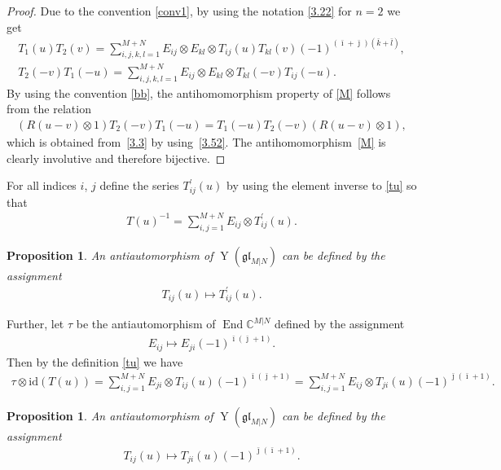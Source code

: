 \documentclass[10pt,a4paper]{amsart}
\numberwithin{equation}{section}
\newtheorem{Proposition}[Theorem]{Proposition}
\def\bi{{\bar\imath }}
\def\bj{{\bar\jmath }}
\def\bk{{\bar k }}
\def\bl{{\bar l }}
\def\CC{{\mathbb{C}}}
\def\CMN{\CC^{M|N}}
\def\End{\operatorname{End}}
\def\glMN{\mathfrak{gl}_{M|N}}
\def\id{{\mathrm{id}}}
\def\ot{\otimes}
\def\TP{T^{\prime}}
\def\YMN{\operatorname{Y}(\glMN)}
\begin{document}
\begin{proof}Due to the convention \eqref{conv1}, by using
the notation \eqref{3.22} for $n=2$ we get
\begin{gather}\label{TT}
T_1(u) T_2(v)=\sum_{i,j,k,l=1}^{M+N}
E_{ij}\ot E_{kl}\ot T_{ij}(u) T_{kl}(v)
{(-1)}^{( \bi+ \bj )( \bk+ \bl )} ,\\
\label{MM}
T_2(-v) T_1(-u)=\sum_{i,j,k,l=1}^{M+N}
E_{ij}\ot E_{kl}\ot T_{kl}(-v) T_{ij}(-u) .
\end{gather}
By using the convention \eqref{bb}, the antihomomorphism property of \eqref{M} follows from the relation
\begin{gather*}
(R (u-v)\ot1) T_2(-v) T_1(-u)=
T_1(-u) T_2(-v) (R (u-v)\ot1),
\end{gather*}
which is obtained from~\eqref{3.3} by using~\eqref{3.52}.
The antihomomorphism~\eqref{M} is clearly involutive and therefore bijective.
\end{proof}

For all indices $i$, $j$ define the series $\TP_{ij}(u)$
by using the element inverse to \eqref{tu} so that
\begin{gather}\label{tunat}
T(u)^{-1}=\sum_{i,j=1}^{M+N} E_{ij}\ot\TP_{ij}(u) .
\end{gather}

\begin{Proposition}\label{s}
An antiautomorphism of $\YMN$ can be defined by the assignment
\begin{gather}\label{S}
T_{ij}(u)\mapsto\TP_{ij}(u) .
\end{gather}
\end{Proposition}

Further, let $\tau$ be the antiautomorphism of $\End\CMN$
defined by the assignment
\begin{gather*}
E_{ij}\mapsto E_{ji} {(-1)}^{\bi ( \bj + 1)} .
\end{gather*}
Then by the definition \eqref{tu} we have
\begin{gather*}
\tau \ot\id ( T(u) )=
\sum_{i,j=1}^{M+N} E_{ji}\ot T_{ij}(u)
{(-1)}^{\bi ( \bj + 1)}=
\sum_{i,j=1}^{M+N} E_{ij}\ot T_{ji}(u)
{(-1)}^{\bj ( \bi + 1)} .
\end{gather*}

\begin{Proposition}
An antiautomorphism of %
$\YMN$ can be defined by the assignment
\begin{gather}
\label{T}
T_{ij}(u)\mapsto T_{ji}(u)
{(-1)}^{\bj ( \bi + 1)} .
\end{gather}
\end{Proposition}
\end{document}

